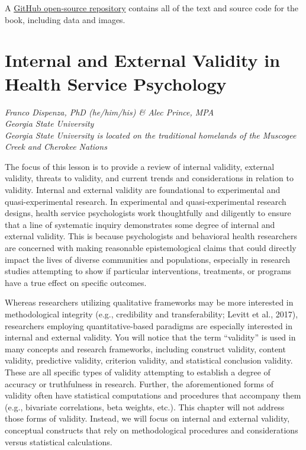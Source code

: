 \documentclass[
  11pt,
]{book}
\begin{document}
A \href{https://github.com/lhbikos/ReC_MultivModel}{GitHub open-source repository} contains all of the text and source code for the book, including data and images.

\hypertarget{InExVal}{%
\chapter{Internal and External Validity in Health Service Psychology}\label{InExVal}}

\emph{Franco Dispenza, PhD (he/him/his) \& Alec Prince, MPA}\\
\emph{Georgia State University}\\
\emph{Georgia State University is located on the traditional homelands of the Muscogee Creek and Cherokee Nations}

The focus of this lesson is to provide a review of internal validity, external validity, threats to validity, and current trends and considerations in relation to validity. Internal and external validity are foundational to experimental and quasi-experimental research. In experimental and quasi-experimental research designs, health service psychologists work thoughtfully and diligently to ensure that a line of systematic inquiry demonstrates some degree of internal and external validity. This is because psychologists and behavioral health researchers are concerned with making reasonable epistemological claims that could directly impact the lives of diverse communities and populations, especially in research studies attempting to show if particular interventions, treatments, or programs have a true effect on specific outcomes.

Whereas researchers utilizing qualitative frameworks may be more interested in methodological integrity (e.g., credibility and transferability; Levitt et al., 2017), researchers employing quantitative-based paradigms are especially interested in internal and external validity. You will notice that the term ``validity'' is used in many concepts and research frameworks, including construct validity, content validity, predictive validity, criterion validity, and statistical conclusion validity. These are all specific types of validity attempting to establish a degree of accuracy or truthfulness in research. Further, the aforementioned forms of validity often have statistical computations and procedures that accompany them (e.g., bivariate correlations, beta weights, etc.). This chapter will not address those forms of validity. Instead, we will focus on internal and external validity, conceptual constructs that rely on methodological procedures and considerations versus statistical calculations.
\end{document}
